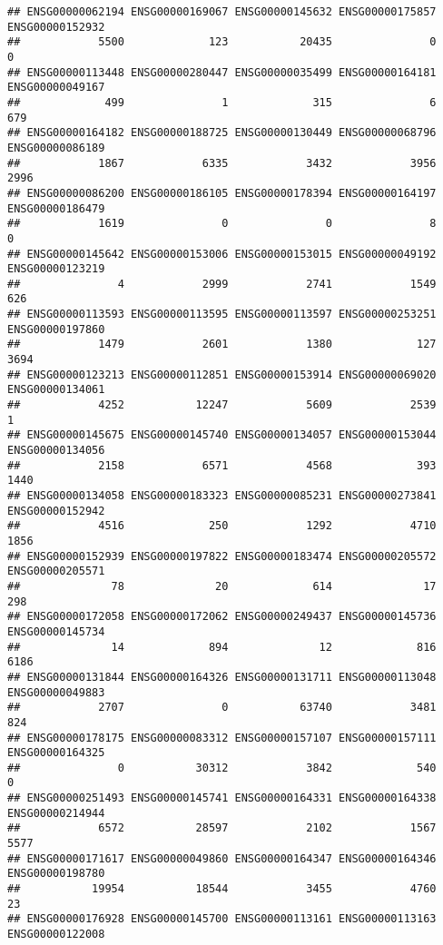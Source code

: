 \documentclass[
]{article}
\begin{document}
\begin{verbatim}
## ENSG00000062194 ENSG00000169067 ENSG00000145632 ENSG00000175857 ENSG00000152932 
##            5500             123           20435               0               0 
## ENSG00000113448 ENSG00000280447 ENSG00000035499 ENSG00000164181 ENSG00000049167 
##             499               1             315               6             679 
## ENSG00000164182 ENSG00000188725 ENSG00000130449 ENSG00000068796 ENSG00000086189 
##            1867            6335            3432            3956            2996 
## ENSG00000086200 ENSG00000186105 ENSG00000178394 ENSG00000164197 ENSG00000186479 
##            1619               0               0               8               0 
## ENSG00000145642 ENSG00000153006 ENSG00000153015 ENSG00000049192 ENSG00000123219 
##               4            2999            2741            1549             626 
## ENSG00000113593 ENSG00000113595 ENSG00000113597 ENSG00000253251 ENSG00000197860 
##            1479            2601            1380             127            3694 
## ENSG00000123213 ENSG00000112851 ENSG00000153914 ENSG00000069020 ENSG00000134061 
##            4252           12247            5609            2539               1 
## ENSG00000145675 ENSG00000145740 ENSG00000134057 ENSG00000153044 ENSG00000134056 
##            2158            6571            4568             393            1440 
## ENSG00000134058 ENSG00000183323 ENSG00000085231 ENSG00000273841 ENSG00000152942 
##            4516             250            1292            4710            1856 
## ENSG00000152939 ENSG00000197822 ENSG00000183474 ENSG00000205572 ENSG00000205571 
##              78              20             614              17             298 
## ENSG00000172058 ENSG00000172062 ENSG00000249437 ENSG00000145736 ENSG00000145734 
##              14             894              12             816            6186 
## ENSG00000131844 ENSG00000164326 ENSG00000131711 ENSG00000113048 ENSG00000049883 
##            2707               0           63740            3481             824 
## ENSG00000178175 ENSG00000083312 ENSG00000157107 ENSG00000157111 ENSG00000164325 
##               0           30312            3842             540               0 
## ENSG00000251493 ENSG00000145741 ENSG00000164331 ENSG00000164338 ENSG00000214944 
##            6572           28597            2102            1567            5577 
## ENSG00000171617 ENSG00000049860 ENSG00000164347 ENSG00000164346 ENSG00000198780 
##           19954           18544            3455            4760              23 
## ENSG00000176928 ENSG00000145700 ENSG00000113161 ENSG00000113163 ENSG00000122008 

\end{verbatim}
\end{document}
